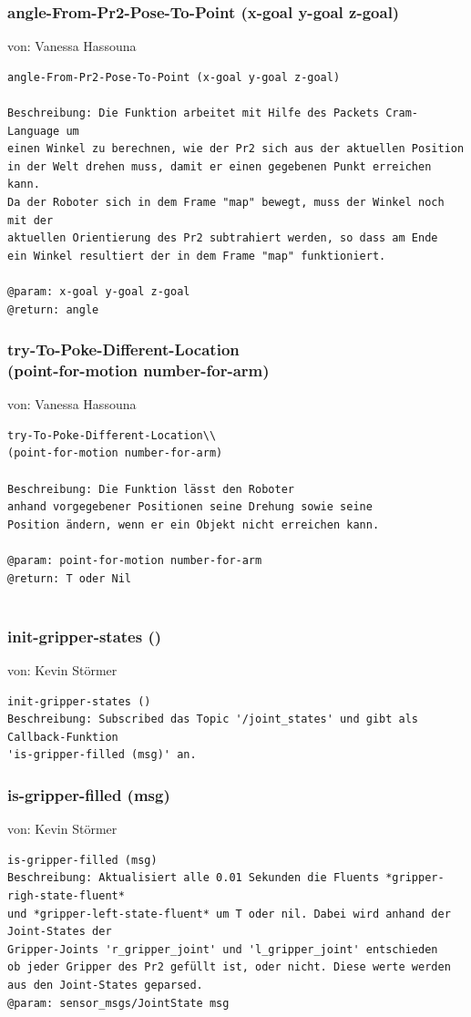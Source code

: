 \documentclass{suturo}
\makeatletter
\newcommand{\chapterauthor}[1]{%
  {\parindent0pt\vspace*{-27pt}%
  \linespread{0}\small\begin{flushright}von: #1\end{flushright}%
  \par\nobreak\vspace*{0pt}}
  \@afterheading%
}
\makeatother
\begin{document}
\subsubsection{angle-From-Pr2-Pose-To-Point (x-goal y-goal z-goal)}
\chapterauthor{Vanessa Hassouna}
\begin{verbatim}
angle-From-Pr2-Pose-To-Point (x-goal y-goal z-goal)

Beschreibung: Die Funktion arbeitet mit Hilfe des Packets Cram-Language um 
einen Winkel zu berechnen, wie der Pr2 sich aus der aktuellen Position 
in der Welt drehen muss, damit er einen gegebenen Punkt erreichen kann.
Da der Roboter sich in dem Frame "map" bewegt, muss der Winkel noch mit der 
aktuellen Orientierung des Pr2 subtrahiert werden, so dass am Ende
ein Winkel resultiert der in dem Frame "map" funktioniert.

@param: x-goal y-goal z-goal 
@return: angle 
\end{verbatim}


\subsubsection{try-To-Poke-Different-Location\\
(point-for-motion number-for-arm)}
\chapterauthor{Vanessa Hassouna}
\begin{verbatim}
try-To-Poke-Different-Location\\
(point-for-motion number-for-arm)

Beschreibung: Die Funktion lässt den Roboter 
anhand vorgegebener Positionen seine Drehung sowie seine
Position ändern, wenn er ein Objekt nicht erreichen kann.

@param: point-for-motion number-for-arm
@return: T oder Nil


\end{verbatim}


\subsubsection{init-gripper-states ()}
\chapterauthor{Kevin Störmer}
\begin{verbatim}
init-gripper-states ()
Beschreibung: Subscribed das Topic '/joint_states' und gibt als Callback-Funktion
'is-gripper-filled (msg)' an.
\end{verbatim}

\subsubsection{is-gripper-filled (msg)}
\chapterauthor{Kevin Störmer}
\begin{verbatim}
is-gripper-filled (msg)
Beschreibung: Aktualisiert alle 0.01 Sekunden die Fluents *gripper-righ-state-fluent* 
und *gripper-left-state-fluent* um T oder nil. Dabei wird anhand der Joint-States der
Gripper-Joints 'r_gripper_joint' und 'l_gripper_joint' entschieden
ob jeder Gripper des Pr2 gefüllt ist, oder nicht. Diese werte werden
aus den Joint-States geparsed.
@param: sensor_msgs/JointState msg 
\end{verbatim}
\end{document}
